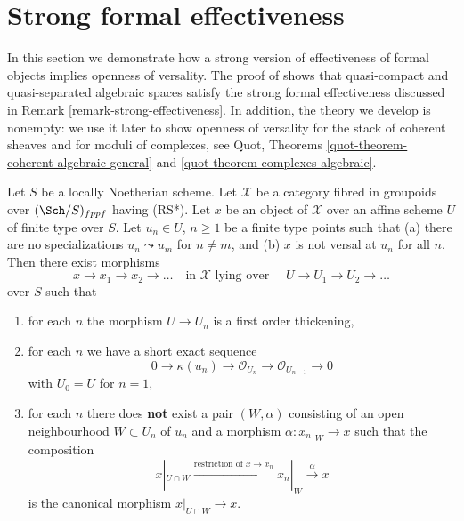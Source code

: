 \section{Strong formal effectiveness}
\label{section-strong-formal-effectiveness}

\noindent
In this section we demonstrate how a strong version of effectiveness
of formal objects implies openness of versality. The proof of
\cite[Theorem 1.1]{Bhatt-Algebraize} shows that quasi-compact and
quasi-separated algebraic spaces satisfy the strong formal effectiveness
discussed in Remark \ref{remark-strong-effectiveness}. In addition, the
theory we develop is nonempty: we use it later to show openness of versality
for the stack of coherent sheaves and for moduli of complexes, see
Quot, Theorems
\ref{quot-theorem-coherent-algebraic-general} and
\ref{quot-theorem-complexes-algebraic}.

\begin{lemma}
\label{lemma-infinite-sequence-pre}
Let $S$ be a locally Noetherian scheme. Let $\mathcal{X}$ be a category
fibred in groupoids over $(\Sch/S)_{fppf}$ having (RS*).
Let $x$ be an object of
$\mathcal{X}$ over an affine scheme $U$ of finite type over $S$.
Let $u_n \in U$, $n \geq 1$ be a finite type points such that
(a) there are no specializations $u_n \leadsto u_m$ for $n \not = m$, and
(b) $x$ is not versal at $u_n$ for all $n$. Then there exist morphisms
$$
x \to x_1 \to x_2 \to \ldots
\quad\text{in }\mathcal{X}\text{ lying over }\quad
U \to U_1 \to U_2 \to \ldots
$$
over $S$ such that
\begin{enumerate}
\item for each $n$ the morphism $U \to U_n$ is a first order
thickening,
\item for each $n$ we have a short exact sequence
$$
0 \to \kappa(u_n) \to \mathcal{O}_{U_n} \to \mathcal{O}_{U_{n - 1}} \to 0
$$
with $U_0 = U$ for $n = 1$,
\item for each $n$ there does {\bf not} exist a pair $(W, \alpha)$
consisting of an open neighbourhood $W \subset U_n$ of $u_n$
and a morphism $\alpha : x_n|_W \to x$
such that the composition
$$
x|_{U \cap W} \xrightarrow{\text{restriction of }x \to x_n}
x_n|_W \xrightarrow{\alpha} x
$$
is the canonical morphism $x|_{U \cap W} \to x$.
\end{enumerate}
\end{lemma}

